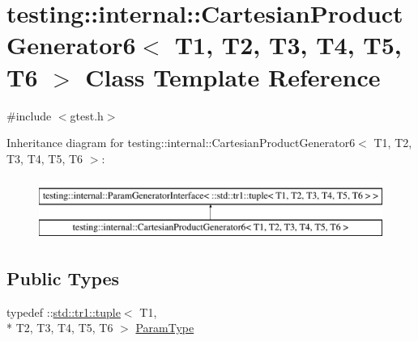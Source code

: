 \hypertarget{classtesting_1_1internal_1_1_cartesian_product_generator6}{\section{testing\-:\-:internal\-:\-:Cartesian\-Product\-Generator6$<$ T1, T2, T3, T4, T5, T6 $>$ Class Template Reference}
\label{classtesting_1_1internal_1_1_cartesian_product_generator6}
}


{\ttfamily \#include $<$gtest.\-h$>$}

Inheritance diagram for testing\-:\-:internal\-:\-:Cartesian\-Product\-Generator6$<$ T1, T2, T3, T4, T5, T6 $>$\-:\begin{figure}[H]
\begin{center}
\leavevmode
\includegraphics[height=2.000000cm]{classtesting_1_1internal_1_1_cartesian_product_generator6}
\end{center}
\end{figure}
\subsection*{Public Types}
\begin{DoxyCompactItemize}
\item 
typedef \-::\hyperlink{classstd_1_1tr1_1_1tuple}{std\-::tr1\-::tuple}$<$ T1, \\*
T2, T3, T4, T5, T6 $>$ \hyperlink{classtesting_1_1internal_1_1_cartesian_product_generator6_a308164858b18868e45abab2f168b92db}{Param\-Type}
\end{DoxyCompactItemize}
